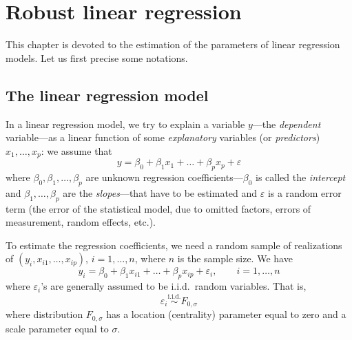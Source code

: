 \chapter{Robust linear regression}
\label{chap:robreg}

This chapter is devoted to the estimation of the parameters of linear
regression models. Let us first precise some notations.

\section{The linear regression model}

In a linear regression model, we try to explain a variable $y$---the
\emph{dependent} variable---as a linear function of some \emph{explanatory}
variables (or \emph{predictors}) $x_{1}, \dots, x_{p}$: we assume that
%
\begin{equation}
    \label{eq:linear_regr_model}
    y = \beta_{0} + \beta_{1}x_{1} + \dots + \beta_{p}x_{p} + \varepsilon
\end{equation}
%
where $\beta_{0}, \beta_{1}, \dots, \beta_{p}$ are unknown regression
coefficients---$\beta_{0}$ is called the \emph{intercept} and $\beta_{1},
\dots, \beta_{p}$ are the \emph{slopes}---that have to be estimated and
$\varepsilon$ is a random error term (the error of the statistical model, due
to omitted factors, errors of measurement, random effects, etc.).

To estimate the regression coefficients, we need a random sample of
realizations of $(y_{i}, x_{i1}, \ldots, x_{ip})$, $i=1, \dots, n$, where $n$
is the sample size. We have
%
\begin{equation}
    \label{eq:linear_regr_model_sample}
    y_{i} = \beta_{0} + \beta_{1}x_{i1} + \dots + \beta_{p}x_{ip} + \varepsilon_{i},
    \qquad i = 1, \dots, n
\end{equation}
%
where $\varepsilon_{i}$'s are generally assumed to be i.i.d.\ random variables.
That is,
\[
    \varepsilon_{i} \stackrel{\text{i.i.d.}}{\sim} F_{0, \sigma}
\]
where distribution $F_{0, \sigma}$ has a location (centrality) parameter equal
to zero and a scale parameter equal to $\sigma$.

